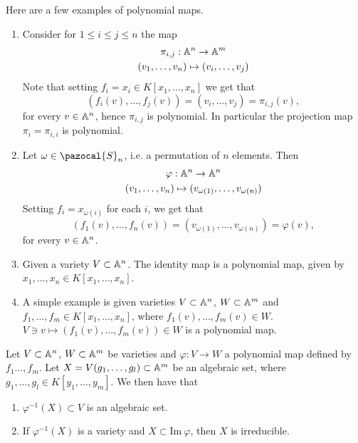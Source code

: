 \begin{example}
    Here are a few examples of polynomial maps.
    \begin{enumerate}
        \item Consider for $1\leq i\leq j\leq n$ the map 
        \begin{gather*}
            \pi_{i,j}:\mathbb{A}^n \rightarrow \mathbb{A}^m\\
            (v_1,\dots,v_n) \mapsto (v_i,\dots,v_j)
        \end{gather*}
        Note that setting $f_i = x_i\in K[x_1,\dots,x_n]$ we get that
        $$(f_i(v),\dots,f_j(v)) = (v_i,\dots,v_j) = \pi_{i,j}(v),$$
        for every $v\in \mathbb{A}^n$, hence $\pi_{i,j}$ is polynomial. In particular the projection map $\pi_i = \pi_{i,i}$ is polynomial.
        \item Let $\omega \in \pazocal{S}_n$, i.e. a permutation of $n$ elements. Then 
        \begin{gather*}
            \varphi : \mathbb{A}^n \rightarrow \mathbb{A}^n\\
            (v_1,\dots,v_n) \mapsto (v_{\omega(1)},\dots,v_{\omega(n)})
        \end{gather*}
        Setting $f_i = x_{\omega(i)}$ for each $i$, we get that 
        $$(f_1(v),\dots,f_n(v))=(v_{\omega(1)},\dots,v_{\omega(n)})=\varphi(v),$$
        for every $v\in \mathbb{A}^n$.
        \item Given a variety $V\subset \mathbb{A}^n$. The identity map is a polynomial map, given by $x_1,\dots,x_n\in K[x_1,\dots,x_n]$.
        \item A simple example is given varieties $V\subset \mathbb{A}^n$, $W\subset \mathbb{A}^m$ and $f_1,\dots,f_m\in K[x_1,\dots,x_n]$, where $f_1(v),\dots,f_m(v)\in W$. $V\ni v\mapsto (f_1(v),\dots,f_m(v))\in W$ is a polynomial map. 
    \end{enumerate}
\end{example}
\begin{lemma}\label{PreimageOfPolMapIsAlgebraic}
    Let $V\subset \mathbb{A}^n$, $W\subset \mathbb{A}^m$ be varieties and $\varphi : V\rightarrow W$ a polynomial map defined by $f_1\dots,f_m$. Let $X=V(g_1,\dots,g_l)\subset \mathbb{A}^m$ be an algebraic set, where $g_1,\dots,g_l\in K[y_1,\dots,y_m]$. We then have that 
    \begin{enumerate}
        \item $\varphi^{-1}(X)\subset V$ is an algebraic set.
        \item If $\varphi^{-1}(X)$ is a variety and $X \subset \text{Im}\ \varphi$, then $X$ is irreducible.
    \end{enumerate}
\end{lemma}
